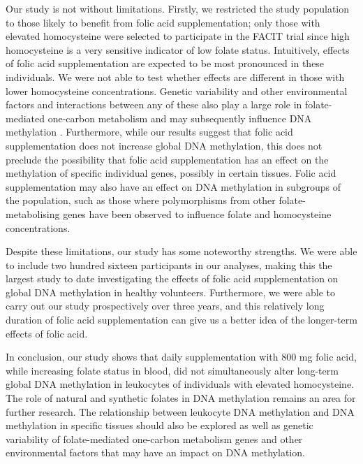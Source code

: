\noindent Our study is not without limitations. Firstly, we restricted the study population to those likely to benefit from folic acid supplementation; only those with elevated homocysteine were selected to participate in the FACIT trial since high homocysteine is a very sensitive indicator of low folate status. Intuitively, effects of folic acid supplementation are expected to be most pronounced in these individuals. We were not able to test whether effects are different in those with lower homocysteine concentrations. Genetic variability and other environmental factors and interactions between any of these also play a large role in folate-mediated one-carbon metabolism \cite{c444} and may subsequently influence DNA methylation \cite{c445}. Furthermore, while our results suggest that folic acid supplementation does not increase global DNA methylation, this does not preclude the possibility that folic acid supplementation has an effect on the methylation of specific individual genes, possibly in certain tissues. Folic acid supplementation may also have an effect on DNA methylation in subgroups of the population, such as those where polymorphisms from other folate-metabolising genes have been observed to influence folate \cite{c446} and homocysteine \cite{c446,c447} concentrations.

\noindent Despite these limitations, our study has some noteworthy strengths. We were able to include two hundred sixteen participants in our analyses, making this the largest study to date investigating the effects of folic acid supplementation on global DNA methylation in healthy volunteers. Furthermore, we were able to carry out our study prospectively over three years, and this relatively long duration of folic acid supplementation can give us a better idea of the longer-term effects of folic acid.

\noindent In conclusion, our study shows that daily supplementation with 800 mg folic acid, while increasing folate status in blood, did not simultaneously alter long-term global DNA methylation in leukocytes of individuals with elevated homocysteine. The role of natural and synthetic folates in DNA methylation remains an area for further research. The relationship between leukocyte DNA methylation and DNA methylation in specific tissues should also be explored as well as genetic variability of folate-mediated one-carbon metabolism genes and other environmental factors that may have an impact on DNA methylation.
 
